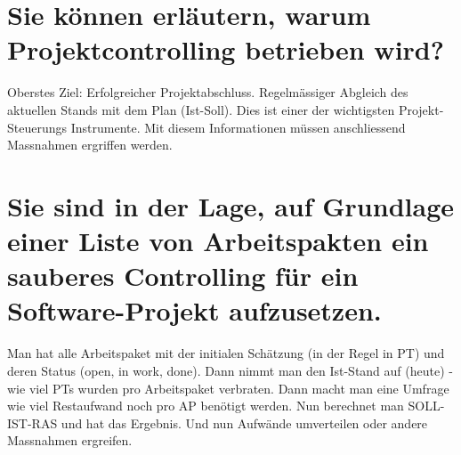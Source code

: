 \section{Sie können erläutern, warum Projektcontrolling betrieben wird?}
Oberstes Ziel: Erfolgreicher Projektabschluss. Regelmässiger Abgleich des aktuellen Stands mit dem Plan (Ist-Soll). Dies ist einer der wichtigsten Projekt-Steuerungs Instrumente. Mit diesem Informationen müssen anschliessend Massnahmen ergriffen werden.

\section{Sie sind in der Lage, auf Grundlage einer Liste von Arbeitspakten ein sauberes Controlling für ein Software-Projekt aufzusetzen.}
Man hat alle Arbeitspaket mit der initialen Schätzung (in der Regel in PT) und deren Status (open, in work, done). Dann nimmt man den Ist-Stand auf (heute) - wie viel PTs wurden pro Arbeitspaket verbraten. Dann macht man eine Umfrage wie viel Restaufwand noch pro AP benötigt werden. Nun berechnet man SOLL-IST-RAS und hat das Ergebnis. Und nun Aufwände umverteilen oder andere Massnahmen ergreifen.